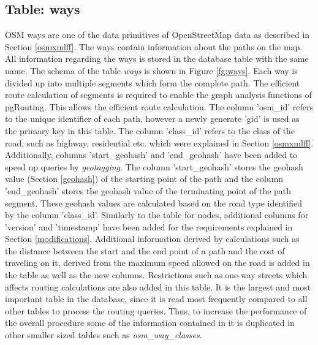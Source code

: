 \subsection{Table: ways}
OSM ways are one of the data primitives of OpenStreetMap data as described in Section \ref{osmxmlff}. The ways contain information about the paths on the map. All information regarding the ways is stored in the database table with the same name. The schema of the table \textit{ways} is shown in Figure \ref{fg:ways}. Each way is divided up into multiple segments which form the complete path. The efficient route calculation of segments is required to enable the graph analysis functions of pgRouting. This allows the efficient route calculation. The column 'osm{\_}id' refers to the unique identifier of each path, however a newly generate 'gid' is used as the primary key in this table. The column 'class{\_}id' refers to the class of the road, such as highway, residential etc. which were explained in Section \ref{osmxmlff}. Additionally, columns 'start{\_}geohash' and 'end{\_}geohash' have been added to speed up queries by \textit{geotagging}. The column 'start{\_}geohash' stores the geohash value (Section \ref{geohash}) of the starting point of the path and the column 'end{\_}geohash' stores the geohash value of the terminating point of the path segment. These geohash values are calculated based on the road type identified by the column 'class{\_}id'. Similarly to the table for nodes, additional columns for 'version' and 'timestamp' have been added for the requirements explained in Section \ref{modifications}. Additional information derived by calculations such as the distance between the start and the end point of a path and the cost of traveling on it, derived from the maximum speed allowed on the road is added in the table as well as the new columns. Restrictions such as one-way streets which affects routing calculations are also added in this table. It is the largest and most important table in the database, since it is read most frequently compared to all other tables to process the routing queries. Thus, to increase the performance of the overall procedure some of the information contained in it is duplicated in other smaller sized tables such as \textit{osm{\_}way{\_}classes}.   
